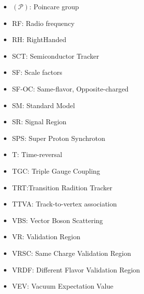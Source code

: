 \begin{itemize}
\item{$(\mathcal{P})$: Poincare group}
\item{RF: Radio frequency}
\item{RH: RightHanded}
\item{SCT: Semiconductor Tracker} 
\item{SF: Scale factors}
\item{SF-OC: Same-flavor, Opposite-charged} 
\item{SM: Standard Model}
\item{SR: Signal Region}
\item{SPS: Super Proton Synchroton} 
\item{T: Time-reversal}
\item{TGC: Triple Gauge Coupling}
\item{TRT:Transition Radition Tracker} 
\item{TTVA: Track-to-vertex association}
\item{VBS: Vector Boson Scattering}
\item{VR: Validation Region}
\item{VRSC: Same Charge Validation Region}
\item{VRDF: Different Flavor Validation Region}
\item{VEV: Vacuum Expectation Value}
\end{itemize}
